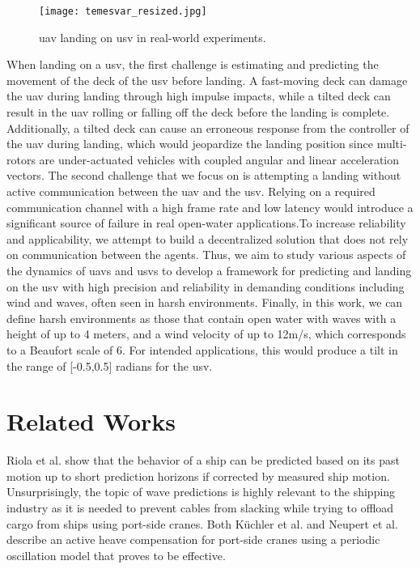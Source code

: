 \documentclass[letterpaper, 10 pt, journal, twoside]{IEEEtran}
\begin{document}
\begin{figure}[!t]
    \centering
    \texttt{[image: temesvar\_resized.jpg]}
    \caption{\ac{uav} landing on \ac{usv} in real-world experiments.}
    \label{fig:landing_image_real}
\end{figure}

When landing on a \ac{usv}, the first challenge is estimating and predicting the movement of the deck of the \ac{usv} before landing. A fast-moving deck can damage the \ac{uav} during landing through high impulse impacts, while a tilted deck can result in the \ac{uav} rolling or falling off the deck before the landing is complete. Additionally, a tilted deck can cause an erroneous response from the controller of the \ac{uav} during landing, which would jeopardize the landing position since multi-rotors are under-actuated vehicles with coupled angular and linear acceleration vectors. The second challenge that we focus on is attempting a landing without active communication between the \ac{uav} and the \ac{usv}. Relying on a required communication channel with a high frame rate and low latency would introduce a significant source of failure in real open-water applications.To increase reliability and applicability, we attempt to build a decentralized solution that does not rely on communication between the agents. Thus, we aim to study various aspects of the dynamics of \acp{uav} and \acp{usv} to develop a framework for predicting and landing on the \ac{usv} with high precision and reliability in demanding conditions including wind and waves, often seen in harsh environments. Finally, in this work, we can define harsh environments as those that contain open water with waves with a height of up to 4 meters, and a wind velocity of up to 12m/s, which corresponds to a Beaufort scale of 6. For intended applications, this would produce a tilt in the range of [-0.5,0.5] radians for the \ac{usv}.


\section{Related Works}
\label{related_works}

Riola et al. \cite{Riola2011} show that the behavior of a ship can be predicted based on its past motion up to short prediction horizons if corrected by measured ship motion. Unsurprisingly, the topic of wave predictions is highly relevant to the shipping industry as it is needed to prevent cables from slacking while trying to offload cargo from ships using port-side cranes. Both K\"{u}chler et al. \cite{Kuchler2011} and Neupert et al. \cite{Neupert2008} describe an active heave compensation for port-side cranes using a periodic oscillation model that proves to be effective. 
\end{document}

